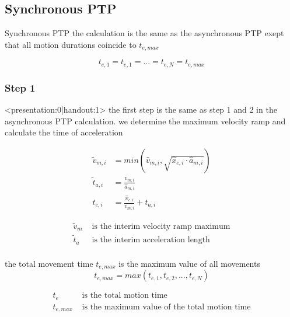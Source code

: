 \documentclass[%
  professionalfonts,%
  xcolor={%
    usenames,%
    dvipsnames,%
    svgnames,%
    table,%
    hyperref%
  }%
]{beamer}
\begin{document}
\subsection{Synchronous PTP}
\begin{frame}{Synchronous PTP}
the calculation is the same as the asynchronous PTP
exept that all motion durations coincide to $t_{e,max}$

\begin{equation*}
t_{e,1} = t_{e,1} = ... = t_{e,N} = t_{e,max}
\end{equation*}
\end{frame}

\subsubsection{Step 1}
\begin{frame}<presentation:0|handout:1>
the first step is the same as step 1 and 2 in the asynchronous PTP calculation. we determine the maximum velocity ramp and  calculate the time of acceleration
\end{frame}

\begin{frame}
\begin{align*}
\tilde{v}_{m,i} & = min(\hat{v}_{m,i},\sqrt{\hat{x}_{e,i} \cdot \hat{a}_{m,i}}) \\
\tilde{t}_{a,i} & = \frac{v_{m,i}}{\hat{a}_{m,i}}\\
t_{e,i} & = \frac{\hat{x}_{e,i}}{v_{m,i}} + t_{a,i}
\end{align*}

\begin{align*}
\tilde{v}_{m} & \text{ is the interim velocity ramp maximum}\\
\tilde{t}_{a} & \text{ is the interim acceleration length}\\
\end{align*}                 
\end{frame}

\begin{frame}
the total movement time $t_{e,max}$ is the maximum value of all movements
\begin{equation*}
t_{e,max} = max(t_{e,1},t_{e,2},...,t_{e,N})
\end{equation*}

\begin{align*}
t_{e} & \text{ is the total motion time } \\
t_{e,max} & \text{ is the maximum value of the total motion time}      
\end{align*}
\end{frame}
  
\end{document}
